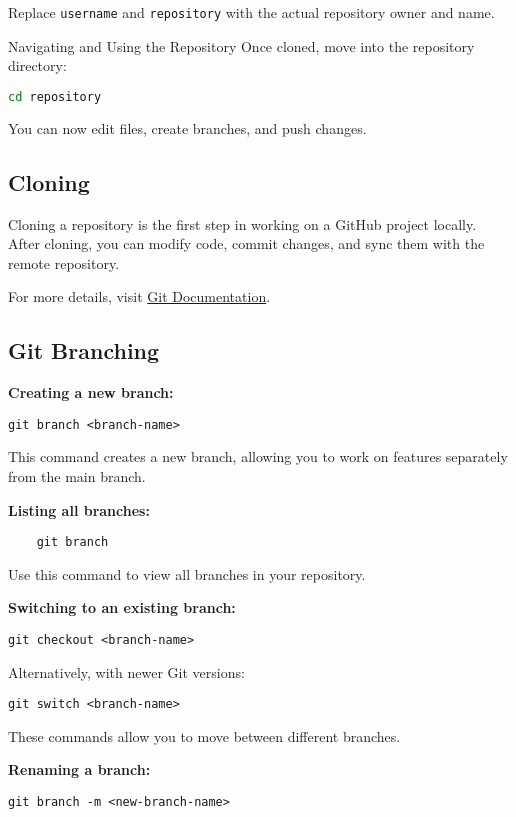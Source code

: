 Replace \texttt{username} and \texttt{repository} with the actual repository owner and name.

Navigating and Using the Repository
Once cloned, move into the repository directory:

\begin{lstlisting}[language=bash]
cd repository
\end{lstlisting}

You can now edit files, create branches, and push changes.

\subsection{Cloning}
Cloning a repository is the first step in working on a GitHub project locally. After cloning, you can modify code, commit changes, and sync them with the remote repository.

For more details, visit \href{https://git-scm.com/}{Git Documentation}.

\subsection{Git Branching}

\textbf{Creating a new branch:}
\begin{verbatim}
git branch <branch-name>
\end{verbatim}
This command creates a new branch, allowing you to work on features separately from the main branch.

\textbf{Listing all branches:}
\begin{lstlisting}
    git branch
\end{lstlisting}

Use this command to view all branches in your repository.

\textbf{Switching to an existing branch:}
\begin{lstlisting}
git checkout <branch-name>
\end{lstlisting}

Alternatively, with newer Git versions:
\begin{lstlisting}
git switch <branch-name>
\end{lstlisting}

These commands allow you to move between different branches.

\textbf{Renaming a branch:}
\begin{lstlisting}
git branch -m <new-branch-name>
\end{lstlisting}

